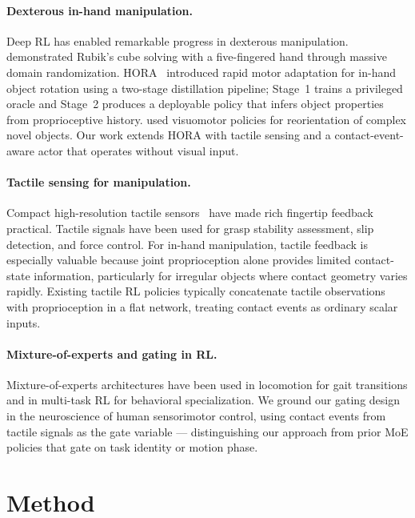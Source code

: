 \documentclass{article}
\begin{document}
\paragraph{Dexterous in-hand manipulation.}
Deep RL has enabled remarkable progress in dexterous manipulation. \citet{andrychowicz2020}
demonstrated Rubik's cube solving with a five-fingered hand through massive domain
randomization. HORA~\citep{qi2023hora} introduced rapid motor adaptation for in-hand object
rotation using a two-stage distillation pipeline; Stage~1 trains a privileged oracle and
Stage~2 produces a deployable policy that infers object properties from proprioceptive history.
\citet{chen2023visual} used visuomotor policies for reorientation of complex novel objects.
Our work extends HORA with tactile sensing and a contact-event-aware actor that operates
without visual input.

\paragraph{Tactile sensing for manipulation.}
Compact high-resolution tactile sensors~\citep{lambeta2020} have made rich fingertip feedback
practical. Tactile signals have been used for grasp stability assessment, slip detection, and
force control. For in-hand manipulation, tactile feedback is especially valuable because joint
proprioception alone provides limited contact-state information, particularly for irregular
objects where contact geometry varies rapidly. Existing tactile RL policies typically
concatenate tactile observations with proprioception in a flat network, treating contact events
as ordinary scalar inputs.

\paragraph{Mixture-of-experts and gating in RL.}
Mixture-of-experts architectures have been used in locomotion for gait transitions and in
multi-task RL for behavioral specialization. We ground our gating design in the neuroscience of
human sensorimotor control, using contact events from tactile signals as the gate variable —
distinguishing our approach from prior MoE policies that gate on task identity or motion phase.


\section{Method}
\label{sec:method}
\end{document}

